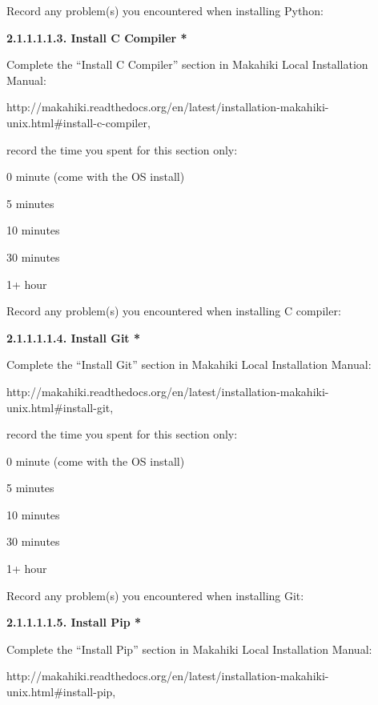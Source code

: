 Record any problem(s) you encountered when installing Python: \underline{\hspace{4cm}}

{\bf 2.1.1.1.1.3. Install C Compiler *}

Complete the ``Install C Compiler'' section in Makahiki Local Installation Manual:

http://makahiki.readthedocs.org/en/latest/installation-makahiki-unix.html\#install-c-compiler, 

record the time you spent for this section only:

\begin{radiobutton}
\item 0 minute (come with the OS install)
\item 5 minutes
\item  10 minutes
\item  30 minutes
\item  1+ hour
\end{radiobutton}

Record any problem(s) you encountered when installing C compiler: \underline{\hspace{4cm}}

{\bf 2.1.1.1.1.4. Install Git *}

Complete the ``Install Git'' section in Makahiki Local Installation Manual:

http://makahiki.readthedocs.org/en/latest/installation-makahiki-unix.html\#install-git, 

record the time you spent for this section only:

\begin{radiobutton}
\item 0 minute (come with the OS install)
\item 5 minutes
\item  10 minutes
\item  30 minutes
\item  1+ hour
\end{radiobutton}

Record any problem(s) you encountered when installing Git: \underline{\hspace{4cm}}

{\bf 2.1.1.1.1.5. Install Pip *}

Complete the ``Install Pip'' section in Makahiki Local Installation Manual:

http://makahiki.readthedocs.org/en/latest/installation-makahiki-unix.html\#install-pip, 

